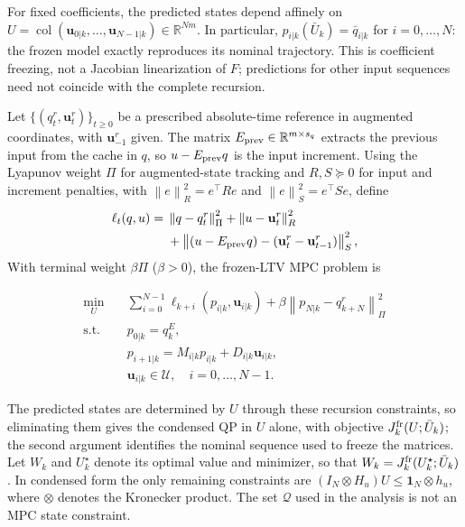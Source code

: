\documentclass[journal]{IEEEtran}
\theoremstyle{plain}
\theoremstyle{definition}
\newcommand{\vu}{\mathbf{u}}
\newcommand{\R}{\mathbb{R}}
\newcommand{\norm}[1]{\left\lVert #1\right\rVert}
\newcommand{\col}{\operatorname{col}}
\begin{document}
{\color{blue}For fixed coefficients, the predicted states depend affinely on $U=\col(\vu_{0|k},\ldots,\vu_{N-1|k})\in\R^{Nm}$. In particular, $p_{i|k}(\bar U_k)=\bar q_{i|k}$ for $i=0,\ldots,N$: the frozen model exactly reproduces its nominal trajectory. This is coefficient freezing, not a Jacobian linearization of $F$; predictions for other input sequences need not coincide with the complete recursion.}

{\color{blue}Let $\{(q_t^r,\vu_t^r)\}_{t\ge0}$ be a prescribed absolute-time reference in augmented coordinates, with $\vu_{-1}^r$ given. The matrix $E_{\rm prev}\in\R^{m\times s_q}$ extracts the previous input from the cache in $q$, so $u-E_{\rm prev}q$ is the input increment. Using the Lyapunov weight $\Pi$ for augmented-state tracking and $R,S\succeq0$ for input and increment penalties, with $\norm{e}_R^2=e^\top Re$ and $\norm{e}_S^2=e^\top Se$, define}
\begin{equation}
\begin{split}
\ell_t(q,u)={}&\norm{q-q_t^r}_\Pi^2+\norm{u-\vu_t^r}_R^2\\
&+\norm{(u-E_{\rm prev}q)-(\vu_t^r-\vu_{t-1}^r)}_S^2,
\end{split}
\label{eq:stage_cost}
\end{equation}
{\color{blue}With terminal weight $\beta\Pi$ ($\beta>0$), the frozen-LTV MPC problem is}

\begin{equation}
\begin{aligned}
\min_{U}\quad
&\sum_{i=0}^{N-1}\ell_{k+i}(p_{i|k},\vu_{i|k})
 +\beta\norm{p_{N|k}-q_{k+N}^r}_\Pi^2\\
\text{s.t.}\quad
&p_{0|k}=q_k^E,\\
&p_{i+1|k}=M_{i|k}p_{i|k}+D_{i|k}\vu_{i|k},\\
&\vu_{i|k}\in\mathcal U,\quad i=0,\ldots,N-1.
\end{aligned}
\label{eq:quadratic_template}
\end{equation}

{\color{blue}The predicted states are determined by $U$ through these recursion constraints, so eliminating them gives the condensed QP in $U$ alone, with objective $J_k^{\rm fr}(U;\bar U_k)$; the second argument identifies the nominal sequence used to freeze the matrices. Let $W_k$ and $U_k^\star$ denote its optimal value and minimizer, so that $W_k=J_k^{\rm fr}(U_k^\star;\bar U_k)$. In condensed form the only remaining constraints are $(I_N\otimes H_u)U\le\mathbf1_N\otimes h_u$, where $\otimes$ denotes the Kronecker product. The set $\mathcal Q$ used in the analysis is not an MPC state constraint.}
\end{document}
